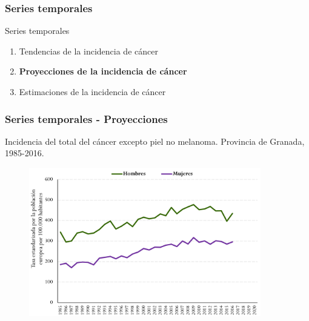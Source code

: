 \documentclass{beamer}
\begin{document}

\begin{frame}\frametitle{Series temporales}
	\begin{block}{Series temporales}
		\begin{enumerate}
			\item Tendencias de la incidencia de cáncer\\[2ex]
			\item \textbf{Proyecciones de la incidencia de cáncer}\\[2ex]
			\item Estimaciones de la incidencia de cáncer\\[2ex]
		\end{enumerate}
	\end{block}
\end{frame}


\begin{frame}\frametitle{Series temporales - Proyecciones}
	\footnotesize{Incidencia del total del cáncer excepto piel no melanoma. Provincia de Granada, 1985-2016.}
	\begin{figure}
		\centering
		\includegraphics[width=0.9\textwidth]{images/proyecciones0.png}
	\end{figure}	
\end{frame}

\end{document}
